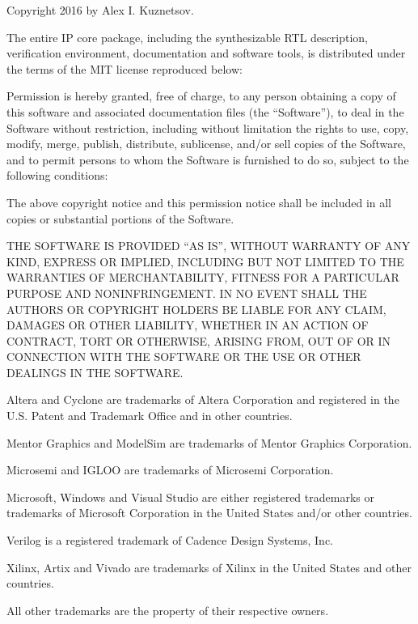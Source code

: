 {
\small
\setlength{\parindent}{0pt}
\nonzeroparskip

\vspace*{\fill}

Copyright \textcopyright{} 2016 by Alex I. Kuznetsov.

The entire \lxp{} IP core package, including the synthesizable RTL description, verification environment, documentation and software tools, is distributed under the terms of the MIT license reproduced below:

Permission is hereby granted, free of charge, to any person obtaining a copy of this software and associated documentation files (the ``Software''), to deal in the Software without restriction, including without limitation the rights to use, copy, modify, merge, publish, distribute, sublicense, and/or sell copies of the Software, and to permit persons to whom the Software is furnished to do so, subject to the following conditions:

The above copyright notice and this permission notice shall be included in all copies or substantial portions of the Software.

THE SOFTWARE IS PROVIDED ``AS IS'', WITHOUT WARRANTY OF ANY KIND, EXPRESS OR IMPLIED, INCLUDING BUT NOT LIMITED TO THE WARRANTIES OF MERCHANTABILITY, FITNESS FOR A PARTICULAR PURPOSE AND NONINFRINGEMENT. IN NO EVENT SHALL THE AUTHORS OR COPYRIGHT HOLDERS BE LIABLE FOR ANY CLAIM, DAMAGES OR OTHER LIABILITY, WHETHER IN AN ACTION OF CONTRACT, TORT OR OTHERWISE, ARISING FROM, OUT OF OR IN CONNECTION WITH THE SOFTWARE OR THE USE OR OTHER DEALINGS IN THE SOFTWARE.

\vspace{4\baselineskip}

Altera and Cyclone are trademarks of Altera Corporation and registered in the U.S. Patent and Trademark Office and in other countries.

Mentor Graphics and ModelSim are trademarks of Mentor Graphics Corporation.

Microsemi and IGLOO are trademarks of Microsemi Corporation.

Microsoft, Windows and Visual Studio are either registered trademarks or trademarks of Microsoft Corporation in the United States and/or other countries.

Verilog is a registered trademark of Cadence Design Systems, Inc.

Xilinx, Artix and Vivado are trademarks of Xilinx in the United States and other countries.

All other trademarks are the property of their respective owners.
}

\cleardoublepage



\tableofcontents*
